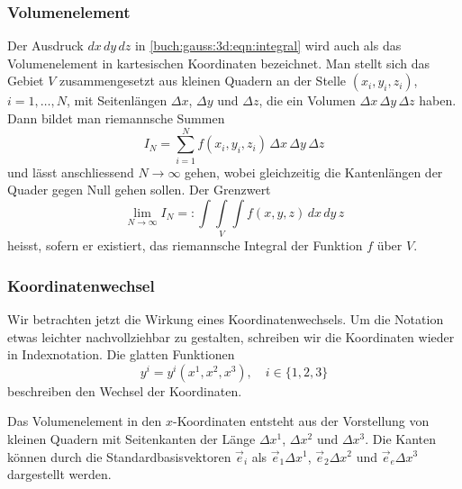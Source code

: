 %
%
\subsubsection{Volumenelement}
Der Ausdruck $dx\,dy\,dz$ in \eqref{buch:gauss:3d:eqn:integral}
wird auch als das Volumenelement in kartesischen Koordinaten bezeichnet.
Man stellt sich das Gebiet $V$ zusammengesetzt aus kleinen Quadern
an der Stelle $(x_i,y_i,z_i)$, $i=1,\dots,N$,
mit Seitenlängen $\Delta x$, $\Delta y$ und $\Delta z$, die ein
Volumen $\Delta x\,\Delta y\,\Delta z$ haben.
Dann bildet man riemannsche Summen
\[
I_N
=
\sum_{i=1}^N
f(x_i,y_i,z_i)\,\Delta x\,\Delta y\,\Delta z
\]
und lässt anschliessend $N\to\infty$ gehen, wobei gleichzeitig
die Kantenlängen der Quader gegen Null gehen sollen.
Der Grenzwert
\[
\lim_{N\to\infty} I_N
=:
\underset{V}{\int\!\!\!\int\!\!\!\int}
f(x,y,z)\,dx\,dy\,z
\]
heisst, sofern er existiert, das riemannsche Integral der Funktion $f$
über $V$.

%
%
\subsubsection{Koordinatenwechsel}
Wir betrachten jetzt die Wirkung eines Koordinatenwechsels.
Um die Notation etwas leichter nachvollziehbar zu gestalten, schreiben
wir die Koordinaten wieder in Indexnotation.
Die glatten Funktionen
\begin{equation}
y^i
=
y^i(x^1,x^2,x^3),\quad i\in\{1,2,3\}
\label{buch:gauss:3d:eqn:koordinatenabbildung}
\end{equation}
beschreiben den Wechsel der Koordinaten.

Das Volumenelement in den $x$-Koordinaten entsteht aus der Vorstellung
von kleinen Quadern mit Seitenkanten der Länge
$\Delta x^1$, 
$\Delta x^2$ und
$\Delta x^3$.
Die Kanten können durch die Standardbasisvektoren $\vec{e}_i$ als
$\vec{e}_1\Delta x^1$, $\vec{e}_2\Delta x^2$ und $\vec{e}_e\Delta x^3$
dargestellt werden.

